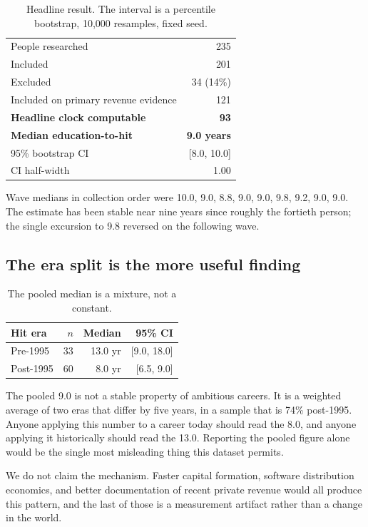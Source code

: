 \documentclass[11pt]{article}
\begin{document}
\begin{table}[h]
\centering
\begin{tabular}{lr}
\toprule
People researched & 235 \\
Included & 201 \\
Excluded & 34 (14\%) \\
Included on primary revenue evidence & 121 \\
\textbf{Headline clock computable} & \textbf{93} \\
\midrule
\textbf{Median education-to-hit} & \textbf{9.0 years} \\
95\% bootstrap CI & [8.0, 10.0] \\
CI half-width & 1.00 \\
\bottomrule
\end{tabular}
\caption{Headline result. The interval is a percentile bootstrap, 10{,}000
resamples, fixed seed.}
\end{table}

Wave medians in collection order were
10.0, 9.0, 8.8, 9.0, 9.0, 9.8, 9.2, 9.0, 9.0.
The estimate has been stable near nine years since roughly the fortieth person;
the single excursion to 9.8 reversed on the following wave.

\subsection{The era split is the more useful finding}

\begin{table}[h]
\centering
\begin{tabular}{lrrr}
\toprule
Hit era & $n$ & Median & 95\% CI \\
\midrule
Pre-1995  & 33 & 13.0 yr & [9.0, 18.0] \\
Post-1995 & 60 &  8.0 yr & [6.5, 9.0] \\
\bottomrule
\end{tabular}
\caption{The pooled median is a mixture, not a constant.}
\end{table}

The pooled 9.0 is not a stable property of ambitious careers. It is a weighted
average of two eras that differ by five years, in a sample that is 74\%
post-1995. Anyone applying this number to a career today should read the 8.0,
and anyone applying it historically should read the 13.0. Reporting the pooled
figure alone would be the single most misleading thing this dataset permits.

We do not claim the mechanism. Faster capital formation, software distribution
economics, and better documentation of recent private revenue would all produce
this pattern, and the last of those is a measurement artifact rather than a
change in the world.
\end{document}
